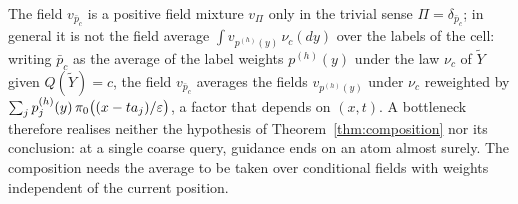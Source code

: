 \documentclass{article} %
\makeatletter
\newif\ificlr
\newcommand{\placeblock}[1]{\ificlr\@nameuse{moved@#1}\fi}
\theoremstyle{plain}
\theoremstyle{definition}
\theoremstyle{remark}
\makeatother
\begin{document}
The field $v_{\bar p_c}$ is a positive field mixture $v_\Pi$ only in the trivial sense
$\Pi=\delta_{\bar p_c}$; in general it is not the field average $\int v_{p^{(h)}(y)}\,\nu_c(dy)$
over the labels of the cell: writing
$\bar p_c$ as the average of the label weights $p^{(h)}(y)$ under the law $\nu_c$ of
$\widetilde Y$ given $Q(\widetilde Y)=c$, the field $v_{\bar p_c}$ averages the fields
$v_{p^{(h)}(y)}$ under $\nu_c$ reweighted by
$\sum_j p^{(h)}_j(y)\,\pi_0\bigl((x-ta_j)/\varepsilon\bigr)$, a factor that depends on $(x,t)$. A bottleneck
therefore realises neither the hypothesis of Theorem~\ref{thm:composition} nor its conclusion: at
a single coarse query, guidance ends on an atom almost surely. The composition needs the average
to be taken over conditional fields with weights independent of the current position.

\label{apx:pf-cfgatom}
\placeblock{sketchcfg}
\end{document}
